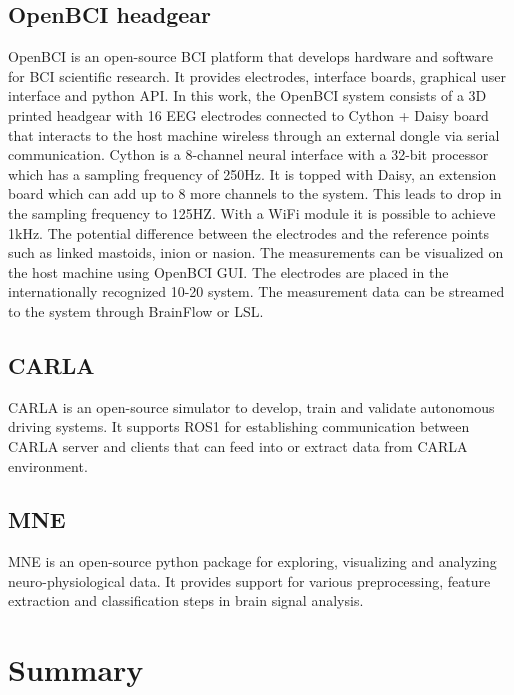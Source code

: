 \subsection*{OpenBCI headgear}
OpenBCI is an open-source BCI platform that develops hardware and software for BCI scientific research. It provides electrodes, interface boards, graphical user interface and python API. In this work, the OpenBCI system consists of a 3D printed headgear with 16 EEG electrodes connected to Cython + Daisy board that interacts to the host machine wireless through an external dongle via serial communication. Cython is a 8-channel neural interface with a 32-bit processor which has a sampling frequency of 250Hz. It is topped with Daisy, an extension board which can add up to 8 more channels to the system. This leads to drop in the sampling frequency to 125HZ. With a WiFi module it is possible to achieve 1kHz. The potential difference between the electrodes and the reference points such as linked mastoids, inion or nasion. The measurements can be visualized on the host machine using OpenBCI GUI. The electrodes are placed in the internationally recognized 10-20 system. The measurement data can be streamed to the system through BrainFlow or LSL. 

\subsection*{CARLA}
CARLA \cite{2017_Carla} is an open-source simulator to develop, train and validate autonomous driving systems. It supports ROS1 for establishing communication between CARLA server and clients that can feed into or extract data from CARLA environment.

\subsection*{MNE}
MNE \cite{2013_MNE} is an open-source python package for exploring, visualizing and analyzing neuro-physiological data. It provides support for various preprocessing, feature extraction and classification
steps in brain signal analysis.

\section*{Summary} 